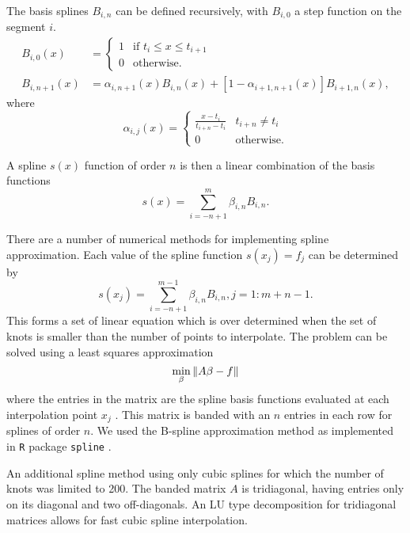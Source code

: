 The basis splines $B_{i,n}$ can be defined recursively, with 
$B_{i, 0}$ a step function on the segment $i$.
\begin{align*}
     B_{i,0}(x) &= \begin{cases} 1 & \text{if } 
     t_i \leq x \leq t_{i+1} \\
          0  & \text{otherwise.}
     \end{cases} \\ 
   B_{i,n + 1}(x) &= \alpha_{i, n + 1}(x)B_{i, n}(x) +  
  [1 - \alpha_{i+1, n + 1}(x)]B_{i +1, n}(x),  
 \end{align*} 
 where 
 \[
  \alpha_{i,j}(x) = \begin{cases}
    \frac{x - t_i} {t_{i + n} - t_i}  & t_{i + n} \neq t_i \\
    0 & \text{otherwise}.
  \end{cases}
 \]

A spline $s(x)$ function of order $n$ 
is then a linear combination of the basis functions 
  \[
    s(x) =  \sum_{i = -n + 1}^{m}\beta_{i,n}B_{i,n}.
  \]
  
There are a number of numerical methods for implementing spline approximation. Each value of the spline function 
$s(x_j) = f_j$ can be determined by
  \[
    s(x_j) =  \sum_{i = - n + 1 }^{m-1} \beta_{i,n}B_{i,n}, 
    j = 1:m + n -1.
  \]
This forms a set of linear equation  
which is over determined when the set of knots is smaller 
than the number of points to interpolate. The problem 
can be solved using a least squares approximation
\[
   \min_{\beta} \left\lVert A\beta - f\right\rVert
\]
where the entries in the matrix are  
the spline basis functions evaluated 
at each interpolation point $x_j$ 
\cite{dahlquist08}. This matrix is banded with 
an $n$ entries in each row for splines of order $n$. 
We used the B-spline approximation method as 
implemented in \texttt{R} package \texttt{spline} 
 \cite{racine}\cite{baseR}.

An additional spline method using only cubic splines for which the number of knots was limited to 200. The banded matrix $A$ is tridiagonal, having entries only on its diagonal and two off-diagonals. An
LU type decomposition for tridiagonal matrices allows for fast cubic spline interpolation.  

